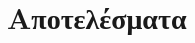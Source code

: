 \chapter{\label{summary}Αποτελέσματα}

\setcounter{equation}{0}
\setcounter{table}{0}
\setcounter{figure}{0}

